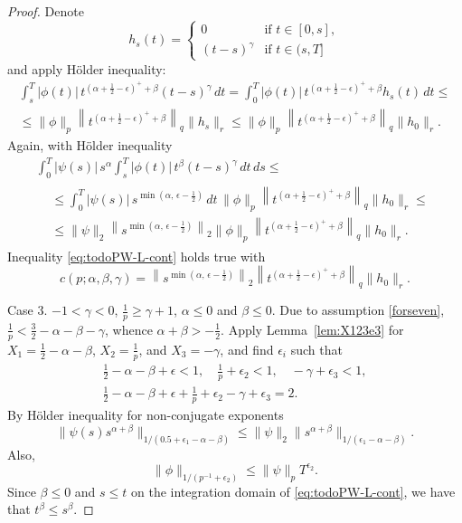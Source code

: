 \documentclass{article}
\theoremstyle{plain}
\theoremstyle{remark}
\theoremstyle{definition}
\begin{document}
\begin{proof}
	Denote
	\[
		h_s(t) = \begin{cases}
			0 & \mbox{if $t\in[0,s]$}, \\
			(t-s)^\gamma & \mbox{if $t\in(s,T]$}
		\end{cases}
	\]
	and apply H\"older inequality:
	\begin{gather*}
		\int_s^T |\phi(t)|\,
		t^{\left(\alpha+\frac12-\epsilon\right)^+ + \beta}
		(t-s)^\gamma
		\, dt=
		\int_0^T |\phi(t)|\,
		t^{\left(\alpha+\frac12-\epsilon\right)^+ + \beta}
		h_s(t)
		\, dt
		\le \\ \le
		 \|\phi\|_p
		\left\|t^{\left(\alpha+\frac12-\epsilon\right)^+ + \beta}\right\|_q
		\|h_s\|_r
		 \le
		\|\phi\|_p
		\left\|t^{\left(\alpha+\frac12-\epsilon\right)^+ + \beta}\right\|_q
		\|h_0\|_r .
	\end{gather*}
	Again, with H\"older inequality
	\begin{multline*}
		\int_0^T |\psi(s)|\, s^\alpha
		\int_s^T |\phi(t)|\, t^\beta (t-s)^\gamma
		\, dt \, ds
		\le \\
		\begin{aligned}
			&\le
			\int_0^T |\psi(s)|\,
			s^{\min\left(\alpha,\, \epsilon-\frac12\right)}
			\, dt \,
			\|\phi\|_p
			\left\|t^{\left(\alpha+\frac12-\epsilon\right)^+
				+ \beta}\right\|_q
			\|h_0\|_r
			\le \\ &\le
			\|\psi\|_2
			\left\|s^{\min\left(\alpha,\, \epsilon-\frac12\right)}\right\|_2
			\|\phi\|_p
			\left\|t^{\left(\alpha+\frac12-\epsilon\right)^+
				+ \beta}\right\|_q
			\|h_0\|_r .
		\end{aligned}
	\end{multline*}
	Inequality \eqref{eq:todoPW-L-cont} holds true with
	\begin{equation*}
		c(p; \alpha, \beta, \gamma) =
		\left\|s^{\min\left(\alpha,\, \epsilon-\frac12\right)}\right\|_2
		\left\|t^{\left(\alpha+\frac12-\epsilon\right)^+ + \beta}\right\|_q
		\|h_0\|_r .
	\end{equation*}

Case 3.
$-1<\gamma<0$, $\frac{1}{p}\ge \gamma+1$,
$\alpha\le0$ and $\beta\le 0$.
Due to assumption
\eqref{forseven},
$\frac{1}{p} < \frac32 - \alpha-\beta-\gamma$,
whence $\alpha+\beta>-\frac12$.
Apply Lemma~\ref{lem:X123e3}
for $X_1 = \frac12-\alpha-\beta$,
$X_2 = \frac{1}{p}$,
and
$X_3 =  -\gamma$, and find $\epsilon_i$
such that
\begin{gather*}
\frac12 - \alpha - \beta + \epsilon < 1,
\quad
\frac1p + \epsilon_2 < 1,
\quad
-\gamma + \epsilon_3 < 1, \\
\frac12 - \alpha - \beta + \epsilon +
\frac1p + \epsilon_2
-\gamma + \epsilon_3 = 2.
\end{gather*}
By H\"older inequality for non-conjugate
exponents
\[
  \|\psi(s) s^{\alpha+\beta}\|_
{1/(0.5+\epsilon_1-\alpha-\beta)}
\le
\|\psi\|_2
\|s^{\alpha+\beta}\|_{1/(\epsilon_1-\alpha-\beta)}.
\]
Also,
\[
\|\phi\|_{1/(p^{-1} + \epsilon_2)}
\le
\|\psi\|_p T^{\epsilon_2} .
\]
Since  $\beta\le 0$
and $s\le t$ on the integration domain
of \eqref{eq:todoPW-L-cont}, we have that
$t^\beta \le s^\beta$.


\end{proof}
\end{document}
